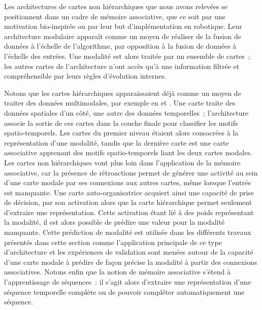 \documentclass[../main]{subfiles}
\begin{document}
Les architectures de cartes non hiérarchiques que nous avons relevées se positionnent dans un cadre de mémoire associative, que ce soit par une motivation bio-inspirée ou par leur but d'implémentation en robotique.
Leur architecture modulaire apparaît comme un moyen de réaliser de la fusion de données à l'échelle de l'algorithme, par opposition à la fusion de données à l'échelle des entrées. Une modalité est alors traitée par un ensemble de cartes~; les autres cartes de l'architecture n'ont accès qu'à une information filtrée et compréhensible par leurs règles d'évolution internes. 


Notons que les cartes hiérarchiques apparaissaient déjà comme un moyen de traiter des données multimodales, par exemple en \cite{mici_self-organizing_2018} et \cite{nawaratne_hierarchical_2020-1}. 
Une carte traite des données spatiales d'un côté, une autre des données temporelles~; l'architecture associe la sortie de ces cartes dans la couche finale pour classifier les motifs spatio-temporels. Les cartes du premier niveau étaient alors consacrées à la représentation d'une modalité, tandis que la dernière carte est une carte associative apprenant des motifs spatio-temporels liant les deux cartes modales.
Les cartes non hiérarchiques vont plus loin dans l'application de la mémoire associative, car la présence de rétroactions permet de générer une activité au sein d'une carte modale par ses connexions aux autres cartes, même lorsque l'entrée est manquante.
Une carte auto-organisatrice acquiert ainsi une capacité de prise de décision, par son activation alors que la carte hiérarchique permet seulement d'extraire une représentation.
Cette activation étant lié à des poids représentant la modalité, il est alors possible de prédire une valeur pour la modalité manquante. 
Cette prédiction de modalité est utilisée dans les différents travaux présentés dans cette section comme l'application principale de ce type d'architecture et les expériences de validation sont menées autour de la capacité d'une carte modale à prédire de façon précise la modalité à partir des connexions associatives.
Notons enfin que la notion de mémoire associative s'étend à l'apprentissage de séquences~: il s'agit alors d'extraire une représentation d'une séquence temporelle complète ou de pouvoir compléter automatiquement une séquence.
\end{document}
